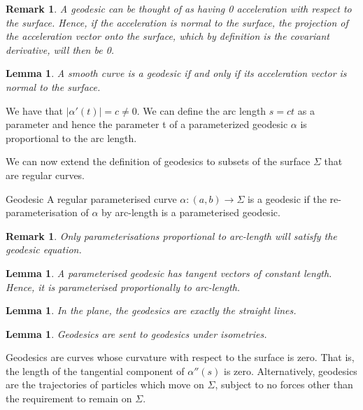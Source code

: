 \documentclass[twoside]{article}
\newtheorem{lemma}[theorem]{Lemma}
\newtheorem{remark}[theorem]{Remark}
\begin{document}
\begin{remark}A geodesic can be thought of as having 0 acceleration with respect to the surface. Hence, if the acceleration is normal to the surface, the projection of the acceleration vector onto the surface, which by definition is the covariant derivative, will then be 0.
\end{remark}

\begin{lemma}A smooth curve is a geodesic if and only if its acceleration vector is normal to the surface.
\end{lemma}

We have that $|\alpha'(t)| = c \neq 0.$ We can define the arc length $s = ct$ as a parameter and hence the parameter t of a parameterized geodesic $\alpha$ is proportional to the arc length.


We can now extend the definition of geodesics to subsets of the surface $\Sigma$ that are regular curves.

\begin{definition_exam}{Geodesic}{} A regular parameterised curve $\alpha: (a,b) \rightarrow \Sigma$ is a geodesic if the re-parameterisation of $\alpha$ by arc-length is a parameterised geodesic.
\end{definition_exam}


\begin{remark}Only parameterisations proportional to arc-length will satisfy the geodesic equation.
\end{remark}

\begin{lemma}
A parameterised geodesic has tangent vectors of constant length. Hence, it is parameterised proportionally to arc-length.
\end{lemma}

\begin{lemma}In the plane, the geodesics are exactly the straight lines.
\end{lemma}

\begin{lemma}Geodesics are sent to geodesics under isometries.
\end{lemma}

Geodesics are curves whose curvature with respect to the surface is zero. That is, the length of the tangential component of $\alpha''(s)$ is zero. Alternatively, geodesics are the trajectories of particles which move on $\Sigma$, subject to no forces other than the requirement to remain on $\Sigma$.
\end{document}
